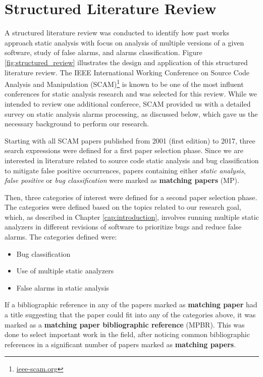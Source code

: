 \chapter{Structured Literature Review}
\label{ch:literature}

A structured literature review was conducted to identify how past works
approach static analysis with focus on analysis of multiple versions of a given
software, study of false alarms, and alarms classification. Figure
\ref{fig:structured_review} illustrates the design and application of this
structured literature review. The IEEE International Working Conference on
Source Code Analysis and Manipulation (SCAM)\footnote{\url{ieee-scam.org}} is
known to be one of the most influent conferences for static analysis research
and was selected for this review. While we intended to review one additional
conferece, SCAM provided us with a detailed survey on static analysis alarms
processing, as discussed below, which gave us the necessary background to
perform our research.



Starting with all SCAM papers published from 2001 (first edition) to 2017,
three search expressions were defined for a first paper selection phase. Since
we are interested in literature related to source code static analysis and  bug
classification to mitigate false positive occurrences, papers containing either
\textit{static analysis}, \textit{false positive} or \textit{bug
classification} were marked as \textbf{matching papers} (MP).

Then, three categories of interest were defined for a second paper selection
phase. The categories were defined based on the topics related to our research
goal, which, as described in Chapter \ref{cap:introduction}, involves running
multiple static analyzers in different revisions of software to prioritize bugs
and reduce false alarms. The categories defined were:

\begin{itemize}
\item Bug classification
\item Use of multiple static analyzers
\item False alarms in static analysis
\end{itemize}

If a bibliographic reference in any of the papers marked as \textbf{matching
paper} had a title suggesting that the paper could fit into any of the
categories above, it was marked as a \textbf{matching paper bibliographic
reference} (MPBR). This was done to select important work in the field,
after noticing common bibliographic references in a significant number of
papers marked as \textbf{matching papers}.

